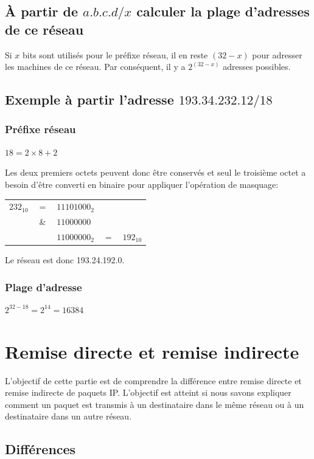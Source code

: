 \documentclass[11pt,a4paper]{article}
\begin{document}
\subsection{À partir de $a.b.c.d/x$ calculer la plage d'adresses de ce réseau}

Si $x$ bits sont utilisés pour le préfixe réseau, il en reste $(32-x)$ pour adresser les machines de ce réseau. Par conséquent, il y a $2^{(32-x)}$ adresses possibles.

\subsection{Exemple à partir l'adresse $193.34.232.12/18$}

\subsubsection*{Préfixe réseau}

$18 = 2 \times 8 + 2$

Les deux premiers octets peuvent donc être conservés et seul le troisième octet a besoin d'être converti en binaire pour appliquer l'opération de masquage:

\begin{tabular}{rclcl}
	$232_{10}$ & $=$ & $1110 1000_2$ \\
	& \& & $1100 0000$ \\
	\hline
	& & $1100 0000_2$ & $=$ & $192_{10}$
\end{tabular}

Le réseau est donc 193.24.192.0.

\subsubsection*{Plage d'adresse}

$2^{32-18} = 2^{14} = 16384$

\section{Remise directe et remise indirecte}

L'objectif de cette partie est de comprendre la différence entre remise directe et remise indirecte de paquets IP. L'objectif est atteint si nous savons expliquer comment un paquet est transmis à un destinataire dans le même réseau ou à un destinataire dans un autre réseau.

\subsection{Différences}
\end{document}

